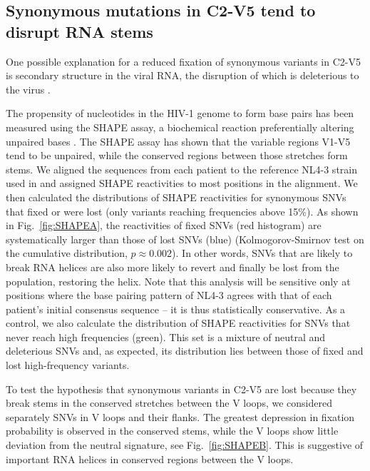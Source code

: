 \documentclass[11pt]{article}
\newcommand{\FIG}[1]{Fig.~\ref{fig:#1}}
\newcommand{\shankaregion}{C2-V5}
\begin{document}
\subsection*{Synonymous mutations in \shankaregion{} tend to disrupt RNA stems}
One possible explanation for a reduced fixation of synonymous variants in
\shankaregion{} is secondary structure in the viral RNA, the disruption of which
is deleterious to the virus \citep{forsdyke_reciprocal_1995,
snoeck_mapping_2011, sanjuan_interplay_2011}.

The propensity of nucleotides in the HIV-1 genome to form base pairs has been
measured using the SHAPE assay, a biochemical reaction preferentially altering
unpaired bases 
\citep{watts_architecture_2009}. The SHAPE assay has shown that the variable
regions V1-V5 tend to be unpaired, while the conserved regions between those
stretches form stems. We aligned the sequences from each patient to
the reference NL4-3 strain used in \citet{watts_architecture_2009} and assigned
SHAPE reactivities to most positions in the alignment. We then calculated the
distributions of SHAPE reactivities for synonymous SNVs that fixed or were
lost (only variants reaching frequencies above 15\%). As shown in
\FIG{SHAPEA}, the reactivities of fixed SNVs (red histogram) are systematically
larger than those of lost SNVs (blue) (Kolmogorov-Smirnov test on the cumulative
distribution, $p\approx 0.002$). In other words, SNVs that are likely to
break RNA helices are also more likely to revert and finally be lost from the
population, restoring the helix. Note that this analysis will be sensitive only
at positions where the base pairing pattern of NL4-3 agrees with that of each
patient's initial consensus sequence -- it is thus statistically conservative.
As a control, we also calculate the distribution of SHAPE reactivities for SNVs
that never reach high frequencies (green). This set is a mixture of neutral and
deleterious SNVs and, as expected, its distribution lies between those of
fixed and lost high-frequency variants.

To test the hypothesis that synonymous variants in \shankaregion{} are lost because they
break stems in the conserved stretches between the V loops, we considered
separately SNVs in V loops and their flanks. The greatest
depression in fixation probability is observed in the conserved stems, while the
V loops show little deviation from the neutral signature, see
\FIG{SHAPEB}. This is suggestive of important RNA helices in conserved
regions between the V loops.
\end{document}
